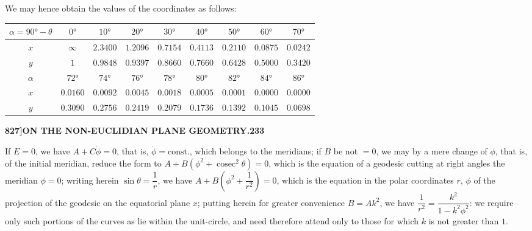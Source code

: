 \documentclass[12pt,a4paper]{article}
\theoremstyle{definition}
\DeclareMathOperator{\cosec}{cosec}
\begin{document}
We may hence obtain the values of the coordinates as follows:

\begin{center}
\begin{tabular}{c|c|c|c|c|c|c|c|c}
$\alpha = 90° - \theta$ & $0°$ & $10°$ & $20°$ & $30°$ & $40°$ & $50°$ & $60°$ & $70°$ \\
\hline
$x$ & $\infty$ & $2.3400$ & $1.2096$ & $0.7154$ & $0.4113$ & $0.2110$ & $0.0875$ & $0.0242$ \\
\hline
$y$ & $1$ & $0.9848$ & $0.9397$ & $0.8660$ & $0.7660$ & $0.6428$ & $0.5000$ & $0.3420$ \\
\hline
$\alpha$ & $72°$ & $74°$ & $76°$ & $78°$ & $80°$ & $82°$ & $84°$ & $86°$ \\
\hline
$x$ & $0.0160$ & $0.0092$ & $0.0045$ & $0.0018$ & $0.0005$ & $0.0001$ & $0.0000$ & $0.0000$ \\
\hline
$y$ & $0.3090$ & $0.2756$ & $0.2419$ & $0.2079$ & $0.1736$ & $0.1392$ & $0.1045$ & $0.0698$
\end{tabular}
\end{center}

\newpage
\setcounter{page}{233}

\noindent\textbf{827]}\hfill\textbf{ON THE NON-EUCLIDIAN PLANE GEOMETRY.}\hfill\textbf{233}

\bigskip

\noindent If $E = 0$, we have $A + C\dot{\phi} = 0$, that is, $\dot{\phi} = \text{const.}$, which belongs to the meridians; if $B$ be not $= 0$, we may by a mere change of $\phi$, that is, of the initial meridian, reduce the form to $A + B(\phi^2 + \cosec^2\theta) = 0$, which is the equation of a geodesic cutting at right angles the meridian $\phi = 0$; writing herein $\sin\theta = \dfrac{1}{r}$, we have $A + B(\phi^2 + \dfrac{1}{r^2}) = 0$, which is the equation in the polar coordinates $r$, $\phi$ of the projection of the geodesic on the equatorial plane $x$; putting herein for greater convenience $B = Ak^2$, we have $\dfrac{1}{r^2} = \dfrac{k^2}{1 - k^2\phi^2}$: we require only such portions of the curves as lie within the unit-circle, and need therefore attend only to those for which $k$ is not greater than $1$.
\end{document}
